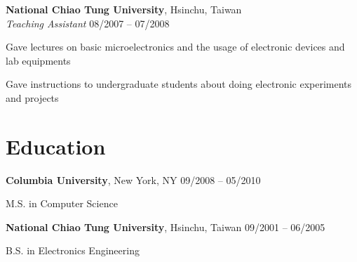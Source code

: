 \documentclass[margin,line]{resume}
\begin{document}
\begin{resume}

    \textbf{National Chiao Tung University}, Hsinchu, Taiwan \\
    \textsl{Teaching Assistant} \hfill 08/2007 -- 07/2008 \vspace{-3mm}\\\vspace{-1mm}%
      \begin{list2}
      \item Gave lectures on basic microelectronics and the usage of electronic devices and lab equipments
      \item Gave instructions to undergraduate students about doing electronic experiments and projects
      \end{list2}

    \section{\mysidestyle Education}

    \textbf{Columbia University}, New York, NY \hfill 09/2008 -- 05/2010 \vspace{-3mm}\\\vspace{-1mm}%
      \begin{list2}
       \item M.S. in Computer Science
      \end{list2}
 
    \textbf{National Chiao Tung University}, Hsinchu, Taiwan \hfill 09/2001 -- 06/2005 \vspace{-3mm}\\\vspace{-1mm}%
      \begin{list2}
       \item B.S. in Electronics Engineering
      \end{list2}


\end{resume}
\end{document}

